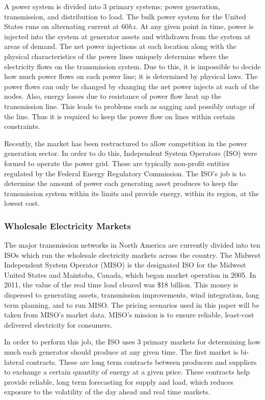 A power system is divided into 3 primary systems; power generation, transmission, and distribution to load.  The bulk power system for the United States runs on alternating current at 60$hz$.  At any given point in time, power is injected into the system at generator assets and withdrawn from the system at areas of demand.  The net power injections at each location along with the physical characteristics of the power lines uniquely determine where the electricity flows on the transmission system.  Due to this, it is impossible to decide how much power flows on each power line; it is determined by physical laws.  The power flows can only be changed by changing the net power injects at each of the nodes.  Also, energy losses due to resistance of power flow heat up the transmission line.  This leads to problems such as sagging and possibly outage of the line.  Thus it is required to keep the power flow on lines within certain constraints.  

Recently, the market has been restructured to allow competition in the power generation sector.  In order to do this, Independent System Operators (ISO) were formed to operate the power grid.  These are typically non-profit entities regulated by the Federal Energy Regulatory Commission.  The ISO's job is to determine the amount of power each generating asset produces to keep the transmission system within its limits and provide energy, within its region, at the lowest cost.  

\subsubsection{Wholesale Electricity Markets}

The major transmission networks in North America are currently divided into ten ISOs which run the wholesale electricity markets across the country.  The Midwest Independent System Operator (MISO) is the designated ISO for the Midwest United States and Maintoba, Canada, which began market operation in 2005.  In 2011, the value of the real time load cleared was \$18 billion.  This money is dispersed to generating assets, transmission improvements, wind integration, long term planning, and to run MISO.  The pricing scenarios used in this paper will be taken from MISO's market data.  MISO's mission is to ensure reliable, least-cost delivered electricity for consumers.	  

In order to perform this job, the ISO uses 3 primary markets for determining how much each generator should produce at any given time.  The first market is bi-lateral contracts.  These are long term contracts between producers and suppliers to exchange a certain quantity of energy at a given price.  These contracts help provide reliable, long term forecasting for supply and load, which reduces exposure to the volatility of the day ahead and real time markets.  

